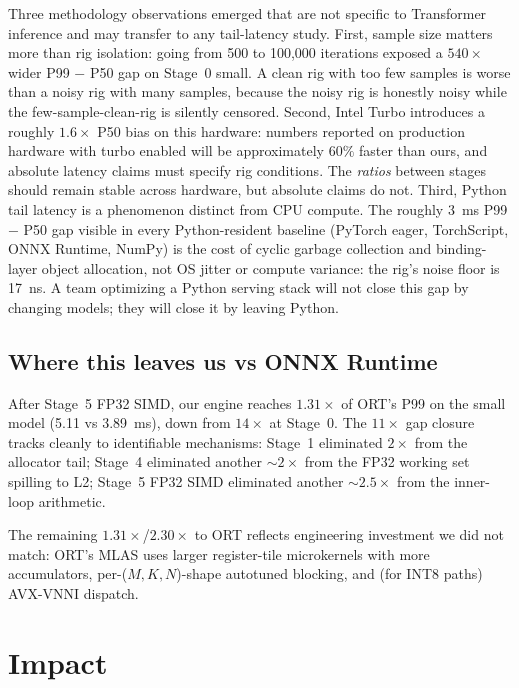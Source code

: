 \documentclass{article}
\begin{document}
Three methodology observations emerged that are not specific to Transformer inference and may transfer to any tail-latency study.
First, sample size matters more than rig isolation: going from 500 to 100{,}000 iterations exposed a $540\times$ wider P99 $-$ P50 gap on Stage~0 small.
A clean rig with too few samples is worse than a noisy rig with many samples, because the noisy rig is honestly noisy while the few-sample-clean-rig is silently censored.
Second, Intel Turbo introduces a roughly $1.6\times$ P50 bias on this hardware: numbers reported on production hardware with turbo enabled will be approximately $60\%$ faster than ours, and absolute latency claims must specify rig conditions.
The \emph{ratios} between stages should remain stable across hardware, but absolute claims do not.
Third, Python tail latency is a phenomenon distinct from CPU compute.
The roughly 3~ms P99 $-$ P50 gap visible in every Python-resident baseline (PyTorch eager, TorchScript, ONNX Runtime, NumPy) is the cost of cyclic garbage collection and binding-layer object allocation, not OS jitter or compute variance: the rig's noise floor is 17~ns.
A team optimizing a Python serving stack will not close this gap by changing models; they will close it by leaving Python.

\subsection{Where this leaves us vs ONNX Runtime}

After Stage~5 FP32 SIMD, our engine reaches $1.31\times$ of ORT's P99 on the small model (5.11 vs 3.89~ms), down from $14\times$ at Stage~0.
The $11\times$ gap closure tracks cleanly to identifiable mechanisms: Stage~1 eliminated $2\times$ from the allocator tail; Stage~4 eliminated another $\sim$$2\times$ from the FP32 working set spilling to L2; Stage~5 FP32 SIMD eliminated another $\sim$$2.5\times$ from the inner-loop arithmetic.

The remaining $1.31\times$/$2.30\times$ to ORT reflects engineering investment we did not match: ORT's MLAS uses larger register-tile microkernels with more accumulators, per-($M, K, N$)-shape autotuned blocking, and (for INT8 paths) AVX-VNNI dispatch.

\section{Impact}
\label{sec:impact}
\end{document}
